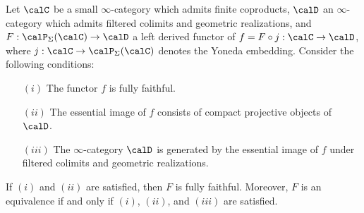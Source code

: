 \begin{proposition}\label{smearof}
Let $\calC$ be a small $\infty$-category which admits finite coproducts, 
$\calD$ an $\infty$-category which admits filtered colimits and geometric realizations,
and $F: \calP_{\Sigma}(\calC) \rightarrow \calD$ a left derived functor of
$f = F \circ j: \calC \rightarrow \calD$, where $j: \calC \rightarrow \calP_{\Sigma}(\calC)$ denotes the Yoneda embedding. Consider the following conditions:
\begin{itemize}
\item[$(i)$] The functor $f$ is fully faithful.
\item[$(ii)$] The essential image of $f$ consists of compact projective objects of $\calD$.
\item[$(iii)$] The $\infty$-category $\calD$ is generated by the essential image of $f$ under filtered colimits and geometric realizations.
\end{itemize}
If $(i)$ and $(ii)$ are satisfied, then $F$ is fully faithful. Moreover, $F$ is an equivalence if
and only if $(i)$, $(ii)$, and $(iii)$ are satisfied.
\end{proposition}

